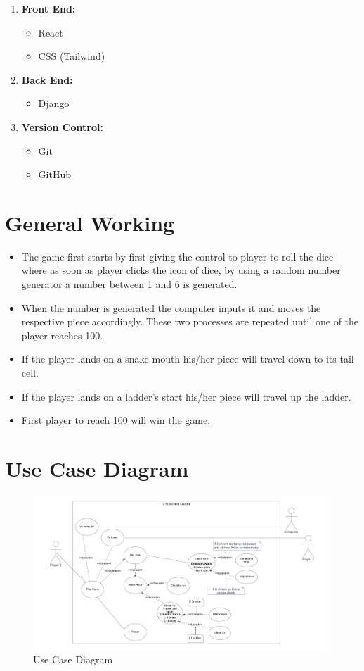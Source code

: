 \documentclass{article}
\begin{document}
    \begin{enumerate}
        \item \textbf{Front End: }
            \begin{itemize}
                \item React
                \item CSS (Tailwind)
            \end{itemize}

        \item \textbf{Back End: }
            \begin{itemize}
                \item Django
            \end{itemize}

        \item \textbf{Version Control: }
        \begin{itemize}
            \item Git
            \item GitHub
        \end{itemize}
    \end{enumerate}
\section{General Working}
    \begin{itemize}
        \item The game first starts by first giving the control to player to roll the dice where as soon as player clicks the icon of dice, by using a random number generator a number between 1 and 6 is generated.
        \item When the number is generated the computer inputs it and moves the respective piece accordingly. These two processes are repeated until one of the player reaches 100.
        \item If the player lands on a snake mouth his/her piece will travel down to its tail cell.
        \item If the player lands on a ladder's start his/her piece will travel up the ladder.
        \item First player to reach 100 will win the game.
    \end{itemize}
\section{Use Case Diagram}

\begin{figure}[H]
    \includegraphics[width = 0.90\linewidth]{Images/Use Case Diagram.png}
    \caption{Use Case Diagram}
\end{figure}
\newpage
    
\end{document}
